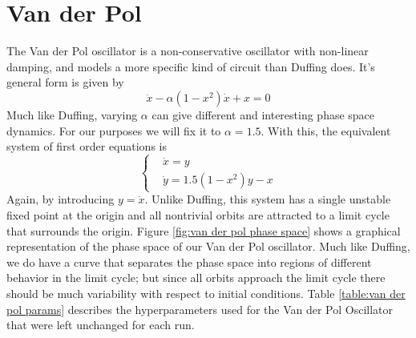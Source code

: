 \section{Van der Pol}
The Van der Pol oscillator is a non-conservative oscillator with non-linear damping, and models a more 
specific kind of circuit than Duffing does. It's general form is given by 
\begin{equation}
    \ddot{x} - \alpha(1 - x^2)\dot{x} + x = 0
\end{equation}
Much like Duffing, varying $\alpha$ can give different and interesting phase space dynamics. For our
purposes we will fix it to $\alpha = 1.5$. With this, the equivalent system of first order equations
is 
\begin{equation}
    \begin{cases}
        & \dot{x} = y \\
        & \dot{y} = 1.5(1 - x^2)y - x  
    \end{cases}
\end{equation}
Again, by introducing $y = \dot{x}$. Unlike Duffing, this system has a single unstable fixed point
at the origin and all nontrivial orbits are attracted to a limit cycle that surrounds the origin. 
Figure \ref{fig:van der pol phase space} shows a graphical representation of the phase space of our 
Van der Pol oscillator. Much like Duffing, we do have a curve that separates the phase space into 
regions of different behavior in the limit cycle; but since all orbits approach the limit cycle there
should be much variability with respect to initial conditions. Table \ref{table:van der pol params} 
describes the hyperparameters used for the Van der Pol Oscillator that were left unchanged for each 
run.
